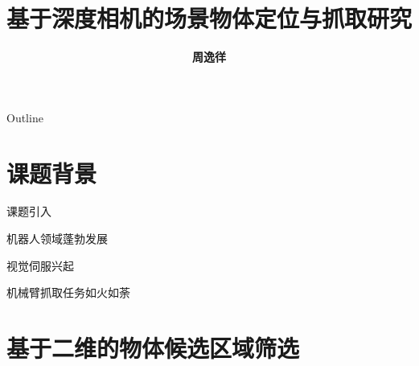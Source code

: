 \documentclass[xcolor=table,compress,blue]{beamer}
\title{\textbf{\Huge{基于深度相机的场景物体定位与抓取研究}}}
\institute{ 
	\textbf{\large{南京大学计算机科学与技术系}}
}
\author{\textbf{\huge{周逸徉}}}
\date{\tiny{}}
\begin{document}
\frame{
	\titlepage
	\thispagestyle{empty}
}
\begin{frame}{Outline}
	\tableofcontents
\end{frame}


%

\section{课题背景}
	\begin{frame}{课题引入}\transdissolve
		\begin{exampleblock}{机器人领域蓬勃发展}
			
		\end{exampleblock}
		\begin{exampleblock}{视觉伺服兴起}
			
		\end{exampleblock}
		\begin{exampleblock}{机械臂抓取任务如火如荼}
			
		\end{exampleblock}
	\end{frame}

\section{基于二维的物体候选区域筛选}
\end{document}
